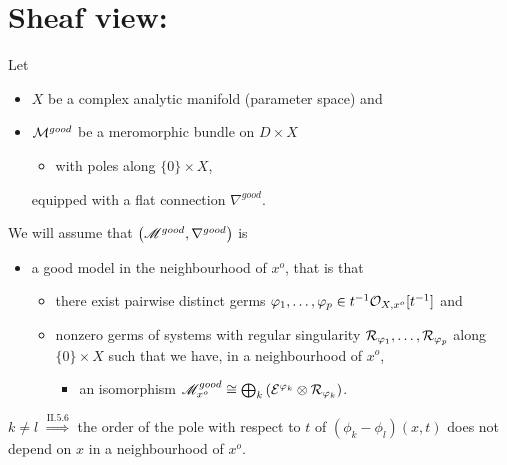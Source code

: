 \section{Sheaf view: \cite{sabbah2007isomonodromic}} %
Let
\begin{itemize}
  \item $X$ be a complex analytic manifold
    (\textcolor{green!40!black}{parameter space}) and
  \item $\mathcal{M}^{good}$ be a meromorphic bundle on $D\times X$
    \begin{itemize}
      \item with poles along $\{0\}\times X$,
    \end{itemize}
    equipped with a flat connection $\nabla^{good}$.
\end{itemize}
We will assume that $\left(\mathscr{M}^{good},\nabla^{good}\right)$ is 
\begin{itemize}
  \item a good model in the neighbourhood of $x^o$, that is that
    \begin{itemize}
      \item there exist pairwise distinct germs $\varphi_1,\dots,\varphi_p\in
        t^{-1}\mathcal{O}_{X,x^o}[t^{-1}]$ and
      \item nonzero germs of systems with regular singularity
        $\mathcal{R}_{\varphi_1},\dots,\mathcal{R}_{\varphi_p}$ along $\{0\}\times X$ such that
            we have, in a neighbourhood of $x^o$,
        \begin{itemize}
          \item an isomorphism $\mathscr{M}_{x^o}^{good}
            \cong\bigoplus_k\left(\mathcal{E}^{\varphi_k}\otimes\mathcal{R}_{\varphi_k}\right)$.
        \end{itemize}
    \end{itemize}
\end{itemize}
$k\neq l$ $\overset{\text{II.5.6}}{\Rightarrow{}}$ the order of the pole with
respect to $t$ of $(\phi_k-\phi_l)(x,t)$ does not depend on $x$ in a
neighbourhood of $x^o$.
